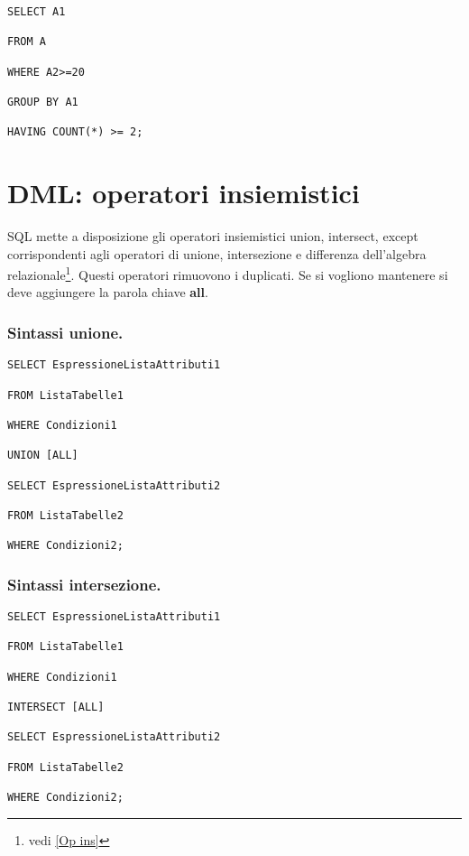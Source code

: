 \begin{lstlisting}[style=SQL, caption=Having]
SELECT A1
    
FROM A

WHERE A2>=20

GROUP BY A1

HAVING COUNT(*) >= 2;
\end{lstlisting}

\section{DML: operatori insiemistici}

SQL mette a disposizione gli operatori insiemistici union, intersect, except corrispondenti agli operatori di unione, intersezione e differenza dell’algebra relazionale\footnote{vedi \ref{Op ins}}. Questi operatori rimuovono i duplicati. Se si vogliono mantenere si deve aggiungere la parola chiave \textbf{all}.

\subsubsection{Sintassi unione.}

\begin{lstlisting}[style=SQL, caption=Union]
SELECT EspressioneListaAttributi1
    
FROM ListaTabelle1

WHERE Condizioni1

UNION [ALL]

SELECT EspressioneListaAttributi2

FROM ListaTabelle2

WHERE Condizioni2;
\end{lstlisting}

\subsubsection{Sintassi intersezione.}

\begin{lstlisting}[style=SQL, caption=Intersect]
SELECT EspressioneListaAttributi1
    
FROM ListaTabelle1

WHERE Condizioni1

INTERSECT [ALL]

SELECT EspressioneListaAttributi2

FROM ListaTabelle2

WHERE Condizioni2;
\end{lstlisting}

